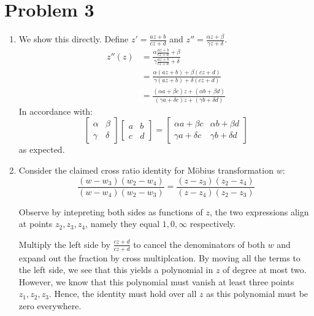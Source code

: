\documentclass[12pt]{article}%
\begin{document}
\section*{Problem 3}
\begin{enumerate}
  \item We show this directly. Define $z' = \frac{az + b}{cz + d}$ and $z'' = \frac{\alpha z + \beta}{\gamma z + \delta}$.
  \begin{align*}
      z''(z) & = \frac{\alpha \frac{az + b}{cz + d} + \beta}{\gamma \frac{az + b}{cz + d} + \delta} \\
      & = \frac{\alpha(az + b) + \beta(cz+d)}{\gamma(az+b) + \delta(cz+d)} \\
      & = \frac{(\alpha a + \beta c)z + (\alpha b + \beta d)}{(\gamma a + \delta c)z + (\gamma b  + \delta d)}
  \end{align*}
  In accordance with:
  \begin{equation*}
    \begin{bmatrix}
      \alpha & \beta \\
      \gamma & \delta
    \end{bmatrix}  \begin{bmatrix}
        a & b\\
        c & d
      \end{bmatrix} = \begin{bmatrix}
        \alpha a + \beta c  & \alpha b + \beta d \\
         \gamma a + \delta c   & \gamma b + \delta d
    \end{bmatrix}
  \end{equation*}
  as expected.

  \item
  Consider the claimed cross ratio identity for M\"{o}bius transformation $w$:
  \begin{equation*}
    \frac{(w - w_3)(w_2-w_4)}{(w - w_4)(w_2 - w_3)} =   \frac{(z - z_3)(z_2-z_4)}{(z - z_4)(z_2 - z_3)}
  \end{equation*}

  Observe by intepreting both sides as functions of $z$, the two expressions align at points $z_2,z_3,z_4$, namely they equal $1,0,\infty$ respectively.

  Multiply the left side by $\frac{cz+d}{cz+d}$ to cancel the denominators of both $w$ and expand out the fraction by cross multiplcation. By moving all the terms to the left side, we see that this yields a polynomial in $z$ of degree at most two. However, we know that this polynomial must vanish at least three points $z_1,z_2,z_3$. Hence, the identity must hold over all $z$ as this polynomial must be zero everywhere.


\end{enumerate}
\end{document}
